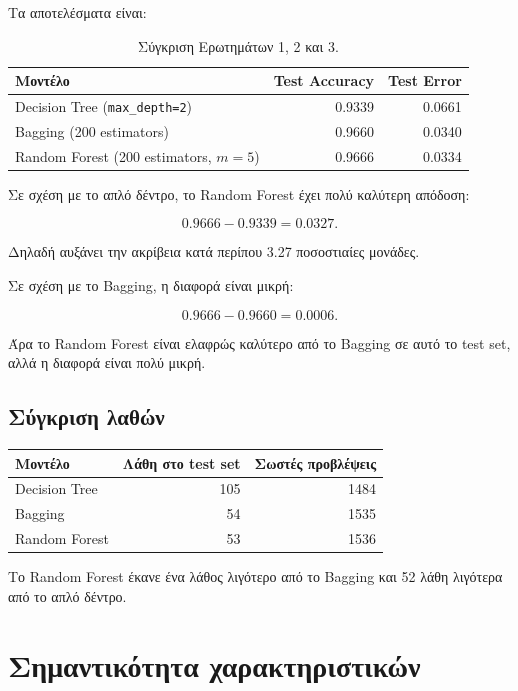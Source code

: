 \documentclass[12pt,a4paper]{article}
\newcommand{\code}[1]{\texttt{\textenglish{#1}}}
\begin{document}
Τα αποτελέσματα είναι:

\begin{table}[H]
\centering
\caption{Σύγκριση Ερωτημάτων 1, 2 και 3.}
\begin{tabular}{lrr}
\toprule
\textbf{Μοντέλο} & \textbf{Test Accuracy} & \textbf{Test Error} \\
\midrule
Decision Tree (\code{max\_depth=2}) & 0.9339 & 0.0661 \\
Bagging (200 estimators) & 0.9660 & 0.0340 \\
Random Forest (200 estimators, $m=5$) & 0.9666 & 0.0334 \\
\bottomrule
\end{tabular}
\end{table}

Σε σχέση με το απλό δέντρο, το Random Forest έχει πολύ καλύτερη απόδοση:

\[
    0.9666 - 0.9339 = 0.0327.
\]

Δηλαδή αυξάνει την ακρίβεια κατά περίπου 3.27 ποσοστιαίες μονάδες.

Σε σχέση με το Bagging, η διαφορά είναι μικρή:

\[
    0.9666 - 0.9660 = 0.0006.
\]

Άρα το Random Forest είναι ελαφρώς καλύτερο από το Bagging σε αυτό το test set,
αλλά η διαφορά είναι πολύ μικρή.

\subsection{Σύγκριση λαθών}

\begin{center}
\begin{tabular}{lrr}
\toprule
\textbf{Μοντέλο} & \textbf{Λάθη στο test set} & \textbf{Σωστές προβλέψεις} \\
\midrule
Decision Tree & 105 & 1484 \\
Bagging & 54 & 1535 \\
Random Forest & 53 & 1536 \\
\bottomrule
\end{tabular}
\end{center}

Το Random Forest έκανε ένα λάθος λιγότερο από το Bagging και 52 λάθη λιγότερα
από το απλό δέντρο.

\section{Σημαντικότητα χαρακτηριστικών}
\end{document}
